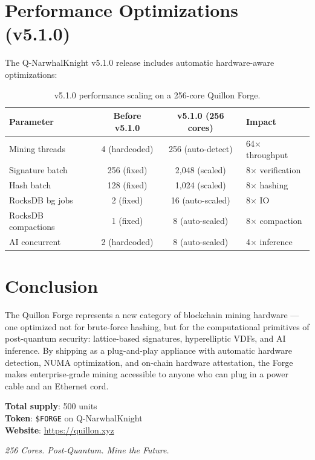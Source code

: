\documentclass[11pt,a4paper]{article}
\begin{document}
\section{Performance Optimizations (v5.1.0)}

The Q-NarwhalKnight v5.1.0 release includes automatic hardware-aware optimizations:

\begin{table}[H]
\centering
\begin{tabular}{@{}lccl@{}}
\toprule
\textbf{Parameter} & \textbf{Before v5.1.0} & \textbf{v5.1.0 (256 cores)} & \textbf{Impact} \\
\midrule
Mining threads & 4 (hardcoded) & 256 (auto-detect) & 64$\times$ throughput \\
Signature batch & 256 (fixed) & 2,048 (scaled) & 8$\times$ verification \\
Hash batch & 128 (fixed) & 1,024 (scaled) & 8$\times$ hashing \\
RocksDB bg jobs & 2 (fixed) & 16 (auto-scaled) & 8$\times$ IO \\
RocksDB compactions & 1 (fixed) & 8 (auto-scaled) & 8$\times$ compaction \\
AI concurrent & 2 (hardcoded) & 8 (auto-scaled) & 4$\times$ inference \\
\bottomrule
\end{tabular}
\caption{v5.1.0 performance scaling on a 256-core Quillon Forge.}
\end{table}

\section{Conclusion}

The Quillon Forge represents a new category of blockchain mining hardware --- one optimized not for brute-force hashing, but for the computational primitives of post-quantum security: lattice-based signatures, hyperelliptic VDFs, and AI inference. By shipping as a plug-and-play appliance with automatic hardware detection, NUMA optimization, and on-chain hardware attestation, the Forge makes enterprise-grade mining accessible to anyone who can plug in a power cable and an Ethernet cord.

\vspace{0.5cm}
\noindent\textbf{Total supply}: 500 units\\
\textbf{Token}: \texttt{\$FORGE} on Q-NarwhalKnight\\
\textbf{Website}: \url{https://quillon.xyz}

\vspace{1cm}
\begin{center}
\textcolor{copper}{\Large\textit{256 Cores. Post-Quantum. Mine the Future.}}
\end{center}
\end{document}
